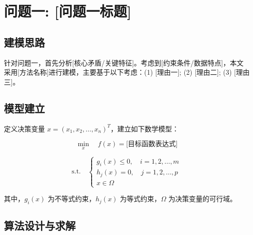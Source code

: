 
\section{问题一: [问题一标题]}

\subsection{建模思路}

针对问题一，首先分析[核心矛盾/关键特征]。考虑到[约束条件/数据特点]，本文采用[方法名称]进行建模，主要基于以下考虑：(1) [理由一]; (2) [理由二]; (3) [理由三]。

\subsection{模型建立}

定义决策变量 $x = (x_1, x_2, \ldots, x_n)^T$，建立如下数学模型：

\begin{equation}
    \min_{x} \quad f(x) = \text{[目标函数表达式]}
\end{equation}

\begin{equation}
    \text{s.t.} \quad
    \begin{cases}
        g_i(x) \leq 0, \quad i = 1, 2, \ldots, m \\
        h_j(x) = 0, \quad j = 1, 2, \ldots, p \\
        x \in \Omega
    \end{cases}
\end{equation}

其中，$g_i(x)$ 为不等式约束，$h_j(x)$ 为等式约束，$\Omega$ 为决策变量的可行域。

\subsection{算法设计与求解}

